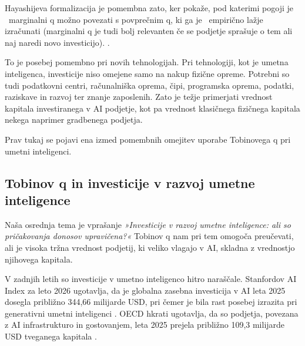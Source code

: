 \documentclass[12pt,a4paper]{article}
\begin{document}

Hayashijeva formalizacija je pomembna zato, ker pokaže, pod katerimi pogoji je  marginalni q možno povezati s povprečnim q,
ki ga je  empirično lažje izračunati (marginalni q je tudi bolj relevanten če se podjetje sprašuje o tem ali naj naredi novo investicijo).
\citep{AndreiMannMoyen2017}.

To je posebej pomembno pri novih tehnologijah. Pri tehnologiji, kot je umetna inteligenca, investicije niso
omejene samo na nakup fizične opreme. Potrebni so tudi podatkovni centri, računalniška oprema, čipi, programska oprema,
podatki, raziskave in razvoj ter znanje zaposlenih. Zato je težje primerjati vrednost kapitala investiranega v AI podjetje, 
kot pa vrednost klasičnega fizičnega kapitala nekega naprimer gradbenega podjetja.



Prav tukaj se pojavi ena izmed pomembnih omejitev uporabe Tobinovega q pri umetni inteligenci.


\subsection{Tobinov q in investicije v razvoj umetne inteligence}


Naša osrednja tema je vprašanje \textit{»Investicije v razvoj umetne inteligence: ali so pričakovanja donosov upravičena?«}
Tobinov q nam pri tem omogoča preučevati, ali je visoka tržna vrednost podjetij, ki veliko vlagajo v AI, skladna z vrednostjo njihovega kapitala.

V zadnjih letih so investicije v umetno inteligenco hitro naraščale. Stanfordov AI Index 
za leto 2026 ugotavlja, da je globalna zasebna investicija v AI leta 2025 dosegla približno 
344,66 milijarde USD, pri čemer je bila rast posebej izrazita pri generativni umetni 
inteligenci \citep{StanfordAIIndex2026}. OECD hkrati ugotavlja, da so podjetja, povezana 
z AI infrastrukturo in gostovanjem, leta 2025 prejela približno 109,3 milijarde USD 
tveganega kapitala \citep{OECD2026}.
\end{document}
